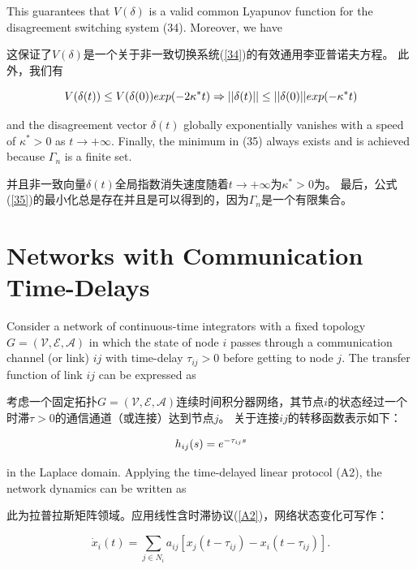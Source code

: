 \documentclass{article}
\begin{document}
{\color[gray]{0.5}
\noindent This guarantees that $V(\delta)$ is a valid common Lyapunov function for the disagreement switching system (34). 
Moreover, we have
}

\noindent 这保证了$V(\delta)$是一个关于非一致切换系统(\ref{34})的有效通用李亚普诺夫方程。
此外，我们有

\begin{equation}
    \notag
    V(\delta(t)) \le V(\delta(0))exp(-2\kappa^*t) \Rightarrow ||\delta(t)|| \le ||\delta(0)||exp(-\kappa^*t)
\end{equation}

{\color[gray]{0.5}
\noindent and the disagreement vector $\delta(t)$ globally exponentially vanishes with a speed of $\kappa^* > 0$ as $t\rightarrow +\infty$. 
Finally, the minimum in (35) always exists and is achieved because $\Gamma_n$ is a ﬁnite set.
}

\noindent 并且非一致向量$\delta(t)$全局指数消失速度随着$t\rightarrow +\infty$为$\kappa^* > 0$为。
最后，公式(\ref{35})的最小化总是存在并且是可以得到的，因为$\Gamma_n$是一个有限集合。

\section{Networks with Communication Time-Delays}
{\color[gray]{0.5}
\noindent Consider a network of continuous-time integrators with a fixed topology $G=(\mathcal{V}, \mathcal{E}, \mathcal{A})$ in which the state of node $i$ passes through a communication channel (or link) $ij$ with time-delay $\tau_{ij}>0$ before getting to node $j$. 
The transfer function of link $ij$ can be expressed as 
}

\noindent 考虑一个固定拓扑$G=(\mathcal{V}, \mathcal{E}, \mathcal{A})$连续时间积分器网络，其节点$i$的状态经过一个时滞$\tau > 0$的通信通道（或连接）达到节点$j$。
关于连接$ij$的转移函数表示如下：

\begin{equation}
    h_{ij}(s) = e^{-\tau_{ij}s}
    \notag
\end{equation}

{\color[gray]{0.5}
\noindent in the Laplace domain. 
Applying the time-delayed linear protocol (A2), the network dynamics can be written as
}

\noindent 此为拉普拉斯矩阵领域。应用线性含时滞协议(\ref{A2})，网络状态变化可写作：

\begin{equation}
    \dot{x}_i(t) = \sum_{j\in N_i} a_{ij} [x_j(t-\tau_{ij}) - x_i(t-\tau_{ij})].
    \tag{37}
    \label{37}
\end{equation}
\end{document}
